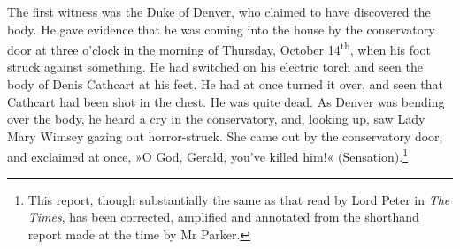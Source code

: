 The first witness was the Duke of Denver, who claimed to have discovered the body. He gave evidence that he was coming into the house by the conservatory door at three o'clock in the morning of Thursday, October 14\textsuperscript{th}, when his foot struck against something. He had switched on his electric torch and seen the body of Denis Cathcart at his feet.  He had at once turned it over, and seen that Cathcart had been shot in the chest. He was quite dead. As Denver was bending over the body, he heard a cry in the conservatory, and, looking up, saw Lady Mary Wimsey gazing out horror-struck. She came out by the conservatory door, and exclaimed at once, »O God, Gerald, you've killed him!« (Sensation).\footnote{This report, though substantially the same as that read by Lord Peter in \textit{The Times}, has been corrected, amplified and annotated from the shorthand report made at the time by Mr Parker.}

